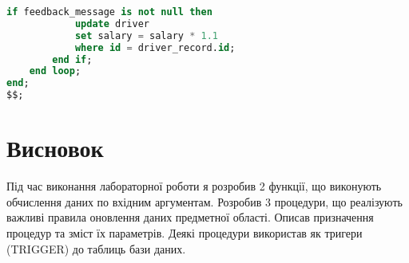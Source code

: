 \documentclass[14pt]{extreport}
\begin{document}
\begin{normalsize}
\begin{small}
\begin{lstlisting}[language=sql]
		if feedback_message is not null then
			update driver
			set salary = salary * 1.1
			where id = driver_record.id;
		end if;
	end loop;
end;
$$;
		\end{lstlisting}
	\end{small}
	
	\section*{Висновок}
	Під час виконання лабораторної роботи я розробив 2 функції, що виконують обчислення даних по вхідним аргументам. Розробив 3 процедури, що реалізують важливі правила оновлення даних предметної області. Описав призначення процедур та зміст їх параметрів. Деякі процедури використав як тригери (TRIGGER) до таблиць бази даних.
	 
\end{normalsize}
\end{document}
